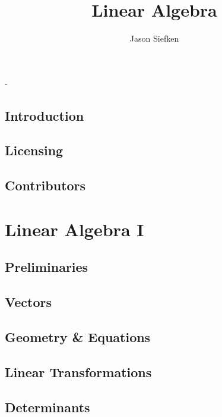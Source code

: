\documentclass[letter, 11pt, onesided]{memoir}
\author{Jason  Siefken}
\title{Linear Algebra}
\numberwithin{dummy}{section}
\theoremstyle{orangenumbox}
\theoremstyle{ocrenumbox}
\begin{document}
\frontmatter
\begin{titlingpage}
	\calccentering{\unitlength}
	\begin{adjustwidth*}{\unitlength}{-\unitlength}
		\maketitle
	\end{adjustwidth*}
\end{titlingpage}

\clearpage

\tableofcontents*
\clearpage

\chapter{Introduction}
	
\chapter{Licensing}
	
\chapter{Contributors}
	
\mainmatter

\part{Linear Algebra I}
\chapter{Preliminaries}
	
	\clearpage
\chapter{Vectors}
	
	\clearpage
\chapter{Geometry \& Equations}
	
	\clearpage
\chapter{Linear Transformations}
	
	\clearpage
\chapter{Determinants}
	
	\clearpage
\end{document}
